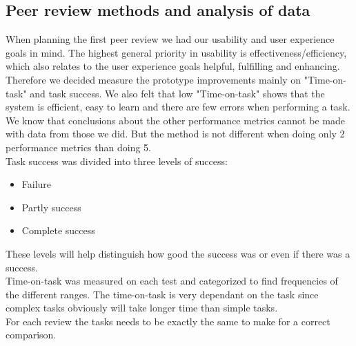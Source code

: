 \subsection{Peer review methods and analysis of data}
When planning the first peer review we had our usability and user experience goals in mind. The highest general priority in usability is effectiveness/efficiency, which also relates to the user experience goals helpful, fulfilling and enhancing. Therefore we decided measure the prototype improvements mainly on "Time-on-task" and task success. We also felt that low "Time-on-task" shows that the system is efficient, easy to learn and there are few errors when performing a task. We know that conclusions about the other performance metrics cannot be made with data from those we did. But the method is not different when doing only 2 performance metrics than doing 5.\\
Task success was divided into three levels of success:
\begin{itemize}
\item Failure
\item Partly success
\item Complete success
\end{itemize}
These levels will help distinguish how good the success was or even if there was a success.\\
Time-on-task was measured on each test and categorized to find frequencies of the different ranges. The time-on-task is very dependant on the task since complex tasks obviously will take longer time than simple tasks.\\
For each review the tasks needs to be exactly the same to make for a correct comparison.\\

